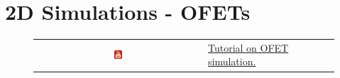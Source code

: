 \chapter{2D Simulations - OFETs}
\label{sec:ofet}

\begin{figure}[H]

\begin{tabular}{ c l }

\includegraphics[width=0.05\textwidth]{./images/youtube.png}

&
\href{https://www.youtube.com/watch?v=0RK9GEyb4HQ}{Tutorial on OFET simulation.}

\end{tabular}
\end{figure}

